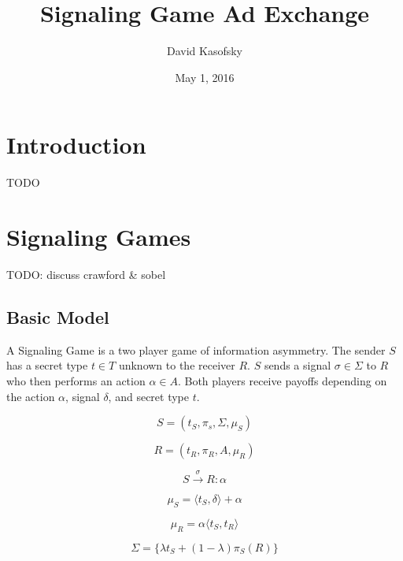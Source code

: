 \documentclass{article}
\title{Signaling Game Ad Exchange}
\author{David Kasofsky}
\date{May 1, 2016}
\begin{document}
\maketitle

\newpage

\tableofcontents

\newpage

\section{Introduction}

TODO

\newpage

\section{Signaling Games}

TODO: discuss crawford \& sobel

\subsection{Basic Model}

A Signaling Game is a two player game of information asymmetry. The sender $S$ has a secret type $t \in T$ unknown to the receiver $R$. $S$ sends a signal $\sigma \in \Sigma$ to $R$ who then performs an action $\alpha \in A$. Both players receive payoffs depending on the action $\alpha$, signal $\delta$, and secret type $t$.

\begin{equation}
	S = (t_S, \pi_s, \Sigma, \mu_S)
\end{equation}

\begin{equation}
	R = (t_R, \pi_R, A, \mu_R)
\end{equation}

\begin{equation}
	S \overset{\sigma}{\longrightarrow} R : \alpha
\end{equation}

\begin{equation}
	\mu_S = \langle t_S, \delta \rangle + \alpha
\end{equation}

\begin{equation}
	\mu_R = \alpha \langle t_S, t_R \rangle
\end{equation}

\begin{equation}
	\Sigma = \lbrace \lambda t_S + (1-\lambda)\pi_S(R) \rbrace
\end{equation}
\end{document}
